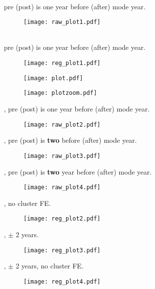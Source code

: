 \documentclass[12pt]{article}
\begin{document}
\begin{table}[H]
\centering

\end{table}



\pagebreak

 \\
\noindent pre (post) is one year before (after) mode year.
\begin{figure}[H]
\centering
\texttt{[image: raw\_plot1.pdf]}
\end{figure}

\\ 
\noindent pre (post) is one year before (after) mode year.
\begin{figure}[H]
\centering
\texttt{[image: reg\_plot1.pdf]}
\end{figure}

\pagebreak

\begin{figure}[H]
\centering
\texttt{[image: plot.pdf]}
\end{figure}

\begin{figure}[H]
\centering
\texttt{[image: plotzoom.pdf]}
\end{figure}

\pagebreak
{ \small
{}, pre (post) is one year before (after) mode year.
\begin{figure}[H]
\centering
\texttt{[image: raw\_plot2.pdf]}
\end{figure}

, pre (post) is {\bf two} before (after) mode year.
\begin{figure}[H]
\centering
\texttt{[image: raw\_plot3.pdf]}
\end{figure}

, pre (post) is {\bf two}  year before (after) mode year.
\begin{figure}[H]
\centering
\texttt{[image: raw\_plot4.pdf]}
\end{figure}
}

\pagebreak
{ \small
{}, no cluster FE.
\begin{figure}[H]
\centering
\texttt{[image: reg\_plot2.pdf]}
\end{figure}

, $\pm$ 2 years.
\begin{figure}[H]
\centering
\texttt{[image: reg\_plot3.pdf]}
\end{figure}

, $\pm$ 2 years, no cluster FE.
\begin{figure}[H]
\centering
\texttt{[image: reg\_plot4.pdf]}
\end{figure}
}
\end{document}
